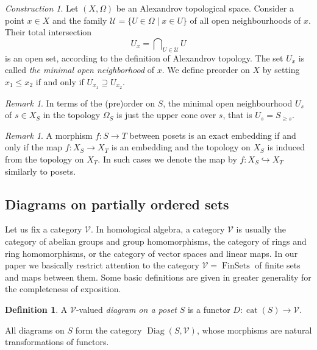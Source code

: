 \documentclass[english,12pt,oneside]{amsproc}
\DeclareMathOperator{\cat}{cat}
\DeclareMathOperator{\FinSets}{FinSets}
\DeclareMathOperator{\Diag}{Diag}
\newcommand{\Vv}{\mathcal{V}}
\newcounter{stmcounter}[section]
\numberwithin{equation}{section}
\theoremstyle{plain}
\theoremstyle{definition}
\newtheorem{defin}[stmcounter]{Definition}
\theoremstyle{remark}
\newtheorem{rem}[stmcounter]{Remark}
\newtheorem{con}[stmcounter]{Construction}
\begin{document}
\begin{con}\label{conSpaceToPrepos}
Let $(X,\Omega)$ be an Alexandrov topological space. Consider a point $x\in X$ and the family $\mathcal{U}=\{U\in \Omega\mid x\in U\}$ of all open neighbourhoods of $x$. Their total intersection
\begin{equation}\label{eqDefUx}
U_x=\bigcap\nolimits_{U\in \mathcal{U}}U
\end{equation}
is an open set, according to the definition of Alexandrov topology. The set $U_x$ is called \emph{the minimal open neighborhood} of $x$. We define preorder on $X$ by setting $x_1\leqslant x_2$ if and only if $U_{x_1}\supseteq U_{x_2}$.
\end{con}

\begin{rem}\label{remMinNbhdIsACone}
In terms of the (pre)order on $S$, the minimal open neighbourhood $U_s$ of $s\in X_S$ in the topology $\Omega_S$ is just the upper cone over $s$, that is $U_s=S_{\geqslant s}$.
\end{rem}

\begin{rem}\label{remExactInclusion}
A morphism $f\colon S\to T$ between posets is an exact embedding if and only if the map $f\colon X_S\to X_T$ is an embedding and the topology on $X_S$ is induced from the topology on $X_T$. In such cases we denote the map by $f\colon X_S\hookrightarrow X_T$ similarly to posets.
\end{rem}

\subsection{Diagrams on partially ordered sets}

Let us fix a category $\Vv$. In homological algebra, a category $\Vv$ is usually the category of abelian groups  and  group homomorphisms, the category of rings  and  ring homomorphisms, or the category of vector spaces and linear maps. In our paper we basically restrict attention to the category $\Vv=\FinSets$ of finite sets and maps between them. Some basic definitions are given in greater generality for the completeness of exposition.

\begin{defin}
A $\Vv$-valued \emph{diagram on a poset} $S$ is a functor $D\colon \cat(S)\to \Vv$.
\end{defin}

All diagrams on $S$ form the category $\Diag(S,\Vv)$, whose morphisms are natural transformations of functors.
\end{document}
